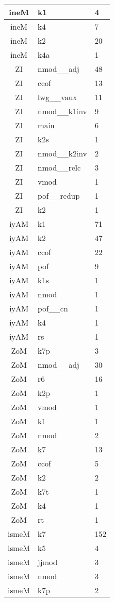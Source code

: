\documentclass[a4 paper]{article}
\begin{document}
\begin{longtable}{cp{}p{}}
ineM & k1 & 4\\ \midrule ineM & k4 & 7\\ \midrule ineM & k2 & 20\\ \midrule ineM & k4a & 1\\ \midrule 
ZI & nmod\_\_adj & 48\\ \midrule ZI & ccof & 13\\ \midrule ZI & lwg\_\_vaux & 11\\ \midrule ZI & nmod\_\_k1inv & 9\\ \midrule ZI & main & 6\\ \midrule ZI & k2s & 1\\ \midrule ZI & nmod\_\_k2inv & 2\\ \midrule ZI & nmod\_\_relc & 3\\ \midrule ZI & vmod & 1\\ \midrule ZI & pof\_\_redup & 1\\ \midrule ZI & k2 & 1\\ \midrule 
iyAM & k1 & 71\\ \midrule iyAM & k2 & 47\\ \midrule iyAM & ccof & 22\\ \midrule iyAM & pof & 9\\ \midrule iyAM & k1s & 1\\ \midrule iyAM & nmod & 1\\ \midrule iyAM & pof\_\_cn & 1\\ \midrule iyAM & k4 & 1\\ \midrule iyAM & rs & 1\\ \midrule 
ZoM & k7p & 3\\ \midrule ZoM & nmod\_\_adj & 30\\ \midrule ZoM & r6 & 16\\ \midrule ZoM & k2p & 1\\ \midrule ZoM & vmod & 1\\ \midrule ZoM & k1 & 1\\ \midrule ZoM & nmod & 2\\ \midrule ZoM & k7 & 13\\ \midrule ZoM & ccof & 5\\ \midrule ZoM & k2 & 2\\ \midrule ZoM & k7t & 1\\ \midrule ZoM & k4 & 1\\ \midrule ZoM & rt & 1\\ \midrule 
ismeM & k7 & 152\\ \midrule ismeM & k5 & 4\\ \midrule ismeM & jjmod & 3\\ \midrule ismeM & nmod & 3\\ \midrule ismeM & k7p & 2\\ \midrule 

\end{longtable}
\end{document}
